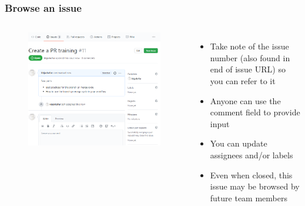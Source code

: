 \documentclass[aspectratio=169]{beamer} %
\begin{document}
\begin{frame}
	\frametitle{Browse an issue}
	\begin{columns}[c]

		\vspace{-.5cm}
		\begin{figure}
			\centering
			\includegraphics[width=\textwidth]{./img/create-issue-2.png}
		\end{figure}


		\begin{itemize}
			\setlength\itemsep{1em}
			\item Take note of the issue number
			(also found in end of issue URL)
			so you can refer to it
			\item Anyone can use the comment field to provide input
			\item You can update assignees and/or labels
			\item Even when closed,
			this issue may be browsed by future team members
		\end{itemize}

	\end{columns}
\end{frame}
\end{document}
